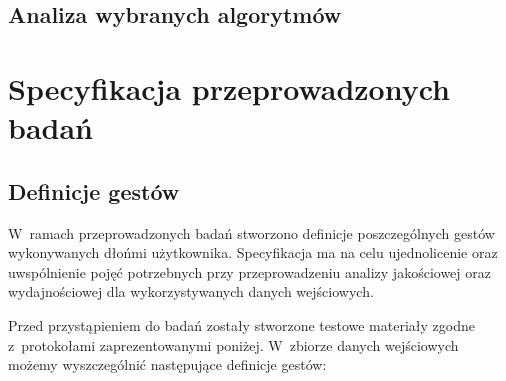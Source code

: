 \section{Analiza wybranych algorytmów}\label{Section_Algorytmy}

\subsection{}\label{Subsection_}
\cite{SalientPointsTracking05}

\subsection{}\label{Subsection_}
\cite{OpticalFlowNonPriori05}

\subsection{}\label{Subsection_}
\cite{HandTrackingVitterbi05}

\subsection{}\label{Subsection_}
\cite{FingertipParticleFilter11}
\cite{ParticleFilter05}

\subsection{}\label{Subsection_}
\cite{TwoStageRandomizedTrees11}
\cite{RandomizedTrees06}

\chapter{Specyfikacja przeprowadzonych badań}\label{Chapter_SpecyfikacjaPrzeprowadzonychBadan}

\section{Definicje gestów}\label{Section_DefinicjeGestow}

W~ramach przeprowadzonych badań stworzono definicje poszczególnych gestów wykonywanych dłońmi użytkownika. Specyfikacja ma na celu ujednolicenie oraz uwspólnienie pojęć potrzebnych przy przeprowadzeniu analizy jakościowej oraz wydajnościowej dla wykorzystywanych danych wejściowych.

Przed przystąpieniem do badań zostały stworzone testowe materiały zgodne z~protokołami zaprezentowanymi poniżej. W~zbiorze danych wejściowych możemy wyszczególnić następujące definicje gestów:


